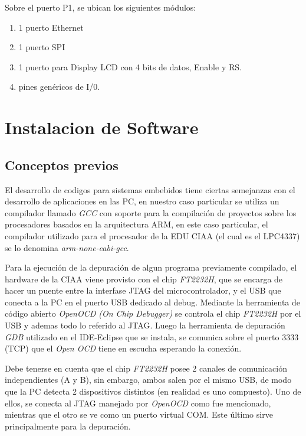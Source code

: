 \documentclass[12pt,letterpaper]{article}
\begin{document}
Sobre el puerto P1, se ubican los siguientes módulos:

\begin{enumerate}
\item 1 puerto Ethernet
\item 1 puerto SPI
\item 1 puerto para Display LCD con 4 bits de datos, Enable y RS.
\item pines genéricos de I/0.
\end{enumerate}

\section{Instalacion de Software}

\subsection{Conceptos previos}
El desarrollo de codigos para sistemas embebidos tiene ciertas semejanzas con el desarrollo de aplicaciones en las PC, en nuestro caso particular se utiliza un compilador llamado \textit{GCC} con soporte para la compilación de proyectos sobre los procesadores basados en la arquitectura ARM, en este caso particular, el compilador utilizado para el procesador de la EDU CIAA (el cual es el LPC4337) se lo denomina \textit{arm-none-eabi-gcc}.

Para la ejecución de la depuración de algun programa previamente compilado, el hardware de la CIAA viene provisto con el chip \textit{FT2232H}, que se encarga de hacer un puente entre la interfase JTAG del microcontrolador, y el USB que conecta a la PC en el puerto USB dedicado al debug. Mediante la herramienta de código abierto \textit{OpenOCD (On Chip Debugger)} se controla el chip \textit{FT2232H} por el USB y ademas todo lo referido al JTAG. Luego la herramienta de depuración \textit{GDB} utilizado en el IDE-Eclipse que se instala, se comunica sobre el puerto 3333 (TCP) que el \textit{Open OCD} tiene en escucha esperando la conexión\cite{descripcionopenocd}.

Debe tenerse en cuenta que el chip \textit{FT2232H} posee 2 canales de comunicación independientes (A y B), sin embargo, ambos salen por el mismo USB, de modo que la PC detecta 2 dispositivos distintos (en realidad es uno compuesto). Uno de ellos, se conecta al JTAG manejado por \textit{OpenOCD} como fue mencionado, mientras que el otro se ve como un puerto virtual COM. Este último sirve principalmente para la depuración.
\end{document}
